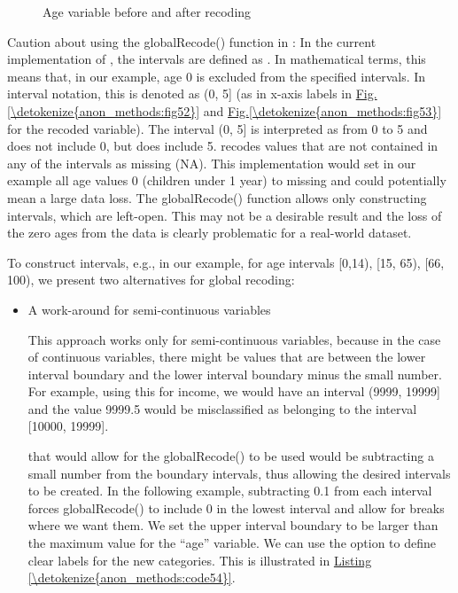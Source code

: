 \documentclass[letterpaper,10pt,english]{sphinxmanual}
\begin{document}
\begin{figure}[htbp]
\centering
\capstart

\noindent{}
\caption{Age variable before and after recoding}\label{\detokenize{anon_methods:fig53}}\label{\detokenize{anon_methods:id28}}\end{figure}

Caution about using the globalRecode() function in : In the
current implementation of , the intervals are defined as
. In mathematical terms, this means that, in our example,
age 0 is excluded from the specified intervals. In interval notation,
this is denoted as (0, 5{]} (as in x-axis labels in \hyperref[\detokenize{anon_methods:fig52}]{Fig.\@ \ref{\detokenize{anon_methods:fig52}}} and
\hyperref[\detokenize{anon_methods:fig53}]{Fig.\@ \ref{\detokenize{anon_methods:fig53}}} for the recoded variable). The interval (0, 5{]} is
interpreted as from 0 to 5 and does not include 0, but does include 5.
 recodes values that are not contained in any of the intervals as
missing (NA). This implementation would set in our example all age
values 0 (children under 1 year) to missing and could potentially mean a
large data loss. The globalRecode() function allows only constructing
intervals, which are left-open. This may not be a desirable result and
the loss of the zero ages from the data is clearly problematic for a
real-world dataset.

To construct  intervals, e.g., in our example, for age
intervals {[}0,14), {[}15, 65), {[}66, 100), we present two alternatives for
global recoding:
\begin{itemize}
\item {} 
A work-around for semi-continuous variables %
\begin{footnote}[3]\sphinxAtStartFootnote
This approach works only for semi-continuous variables, because in
the case of continuous variables, there might be values that are
between the lower interval boundary and the lower interval boundary
minus the small number. For example, using this for income, we would
have an interval (9999, 19999{]} and the value 9999.5 would be
misclassified as belonging to the interval {[}10000, 19999{]}.
%
\end{footnote}
that would allow for the globalRecode() to be used would be
subtracting a small number from the boundary intervals, thus allowing
the desired intervals to be created. In the following example,
subtracting 0.1 from each interval forces globalRecode() to include 0
in the lowest interval and allow for breaks where we want them. We
set the upper interval boundary to be larger than the maximum value
for the “age” variable. We can use the option  to define
clear labels for the new categories. This is illustrated in \hyperref[\detokenize{anon_methods:code54}]{Listing \ref{\detokenize{anon_methods:code54}}}.

\end{itemize}
\end{document}
